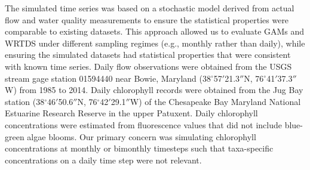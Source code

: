 \documentclass[letterpaper,12pt,oneside]{article}\usepackage[]{graphicx}\usepackage[]{color}
\begin{document}
The simulated time series was based on a stochastic model derived from actual flow and water quality measurements to ensure the statistical properties were comparable to existing datasets.  This approach allowed us to evaluate \acp{GAM} and \ac{WRTDS} under different sampling regimes (e.g., monthly rather than daily), while ensuring the simulated datasets had statistical properties that were consistent with known time series. Daily flow observations were obtained from the \ac{USGS} stream gage station 01594440 near Bowie, Maryland (38$^{\circ}$57$'$21.3$''$N, 76$^{\circ}$41$'$37.3$''$W) from 1985 to 2014.  Daily chlorophyll records were obtained from the Jug Bay station (38$^{\circ}$46$'$50.6$''$N, 76$^{\circ}$42$'$29.1$''$W) of the Chesapeake Bay Maryland National Estuarine Research Reserve in the upper Patuxent.  Daily chlorophyll concentrations were estimated from fluorescence values that did not include blue-green algae blooms.  Our primary concern was simulating chlorophyll concentrations at monthly or bimonthly timesteps such that taxa-specific concentrations on a daily time step were not relevant.
\end{document}
